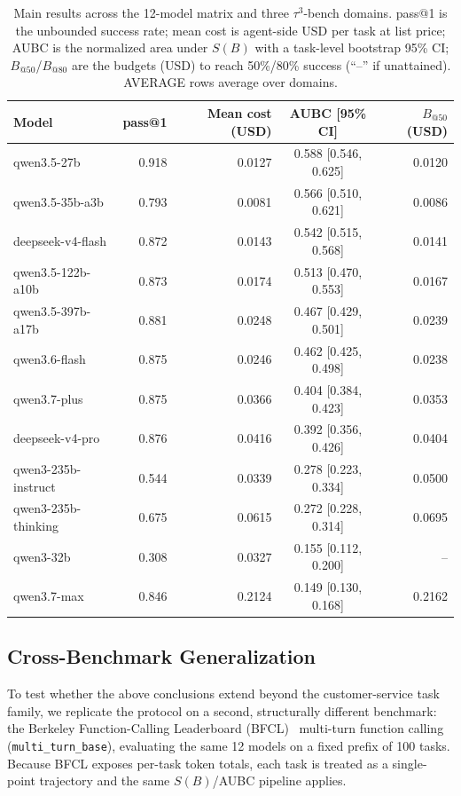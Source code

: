 \documentclass[preprint,authoryear,12pt]{elsarticle}
\begin{document}
\begin{table}[t]
\centering
\caption{Main results across the 12-model matrix and three $\tau^3$-bench domains. pass@1 is the unbounded success rate; mean cost is agent-side USD per task at list price; AUBC is the normalized area under $S(B)$ with a task-level bootstrap 95\% CI; $B_{@50}$/$B_{@80}$ are the budgets (USD) to reach 50\%/80\% success (``--'' if unattained). AVERAGE rows average over domains.}
\label{tab:table1-main}
\begin{tabular}{l r r c r}
\toprule
Model & pass@1 & Mean cost (USD) & AUBC [95\% CI] & $B_{@50}$ (USD) \\
\midrule
qwen3.5-27b & 0.918 & 0.0127 & 0.588 [0.546, 0.625] & 0.0120 \\
qwen3.5-35b-a3b & 0.793 & 0.0081 & 0.566 [0.510, 0.621] & 0.0086 \\
deepseek-v4-flash & 0.872 & 0.0143 & 0.542 [0.515, 0.568] & 0.0141 \\
qwen3.5-122b-a10b & 0.873 & 0.0174 & 0.513 [0.470, 0.553] & 0.0167 \\
qwen3.5-397b-a17b & 0.881 & 0.0248 & 0.467 [0.429, 0.501] & 0.0239 \\
qwen3.6-flash & 0.875 & 0.0246 & 0.462 [0.425, 0.498] & 0.0238 \\
qwen3.7-plus & 0.875 & 0.0366 & 0.404 [0.384, 0.423] & 0.0353 \\
deepseek-v4-pro & 0.876 & 0.0416 & 0.392 [0.356, 0.426] & 0.0404 \\
qwen3-235b-instruct & 0.544 & 0.0339 & 0.278 [0.223, 0.334] & 0.0500 \\
qwen3-235b-thinking & 0.675 & 0.0615 & 0.272 [0.228, 0.314] & 0.0695 \\
qwen3-32b & 0.308 & 0.0327 & 0.155 [0.112, 0.200] & -- \\
qwen3.7-max & 0.846 & 0.2124 & 0.149 [0.130, 0.168] & 0.2162 \\
\bottomrule
\end{tabular}
\end{table}

\subsection{Cross-Benchmark Generalization}
\label{subsec:cross-benchmark}
To test whether the above conclusions extend beyond the customer-service task family, we replicate the protocol on a second, structurally different benchmark: the Berkeley Function-Calling Leaderboard (BFCL)~\cite{patil2024gorilla} multi-turn function calling (\texttt{multi\_turn\_base}), evaluating the same 12 models on a fixed prefix of 100 tasks. Because BFCL exposes per-task token totals, each task is treated as a single-point trajectory and the same $S(B)$/AUBC pipeline applies.
\end{document}
